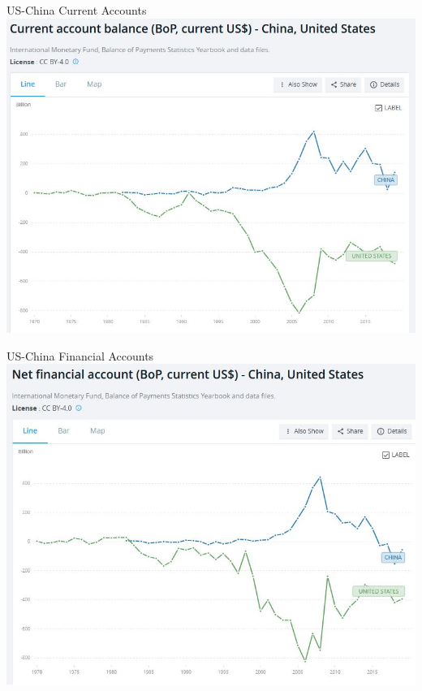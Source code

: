 \documentclass{beamer}
\begin{document}
\begin{frame}{\LARGE US-China Current Accounts}
	\centering
	\includegraphics[width=\textwidth,height=0.8\textheight,keepaspectratio]{US-China current account.JPG}
\end{frame}

\begin{frame}{\LARGE US-China Financial Accounts}
	\centering
	\includegraphics[width=\textwidth,height=0.8\textheight,keepaspectratio]{US-China financial account.JPG}
\end{frame}
\end{document}
